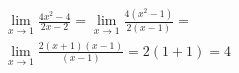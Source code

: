 \begin{ex}
\begin{align}
&\lim_{x\rightarrow 1} \frac{4x^2-4}{2x-2}=\lim_{x\rightarrow 1} \frac{4(x^2-1)}{2(x-1)}=\nonumber\\
&\lim_{x\rightarrow 1} \frac{2(x+1)(x-1)}{(x-1)}=2(1+1) = 4\nonumber
\end{align}
\end{ex}